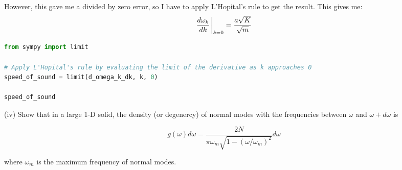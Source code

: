 \documentclass[12pt]{article}
\begin{document}
However, this gave me a divided by zero error, so I have to apply L'Hopital's rule to get the result. This gives me:
\begin{equation}
  \frac{d \omega_{k}}{d k} \eval _{k=0} = \frac{a \sqrt{ K}}{\sqrt{m}}
\end{equation}
\begin{lstlisting}[language=Python]
from sympy import limit

# Apply L'Hopital's rule by evaluating the limit of the derivative as k approaches 0
speed_of_sound = limit(d_omega_k_dk, k, 0)

speed_of_sound
\end{lstlisting}


(iv) Show that in a large 1-D solid, the density (or degenercy) of normal modes with the frequencies between $\omega$ and $\omega+d \omega$ is


\begin{equation*}
g(\omega) d \omega=\frac{2 N}{\pi \omega_{m} \sqrt{1-\left(\omega / \omega_{m}\right)^{2}}} d \omega \tag{10}
\end{equation*}


where $\omega_{m}$ is the maximum frequency of normal modes.
\end{document}
